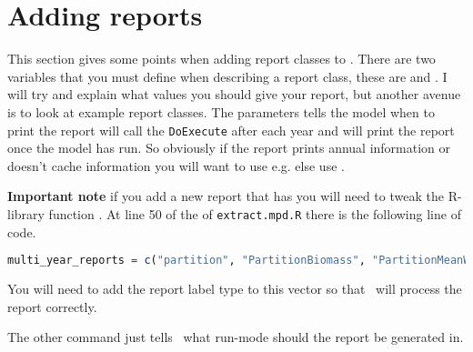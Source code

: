 \section{Adding reports\label{sec:reports}}
This section gives some points when adding report classes to \CNAME. There are two variables that you must define when describing a report class, these are  and . I will try and explain what values you should give your report, but another avenue is to look at example report classes. The  parameters tells the model when to print the report  will call the \texttt{DoExecute} after each year and  will print the report once the model has run. So obviously if the report prints annual information or doesn't cache information you will want to use  e.g.  else use . 

\textbf{Important note} if you add a new report that has   you will need to tweak the R-library function . At line 50 of the of \texttt{extract.mpd.R} there is the following line of code.   

\begin{lstlisting}[language=R]
multi_year_reports = c("partition", "PartitionBiomass", "PartitionMeanWeight")
\end{lstlisting}

You will need to add the report label type to this vector so that \R\ will process the report correctly.

The other command  just tells \CNAME\ what run-mode should the report be generated in.